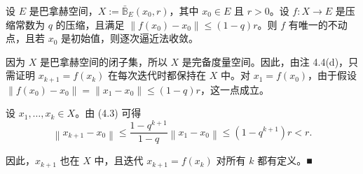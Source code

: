 \begin{proposition}

设 $E$ 是巴拿赫空间，$X := \bar{\mathbb{B}}_E(x_0, r)$，其中 $x_0 \in E$ 且 $r > 0$。设 $f: X \to E$ 是压缩常数为 $q$ 的压缩，且满足 $\|f(x_0) - x_0\| \leq (1 - q)r$。则 $f$ 有唯一的不动点，且若 $x_0$ 是初始值，则逐次逼近法收敛。

\proofhead
因为 $X$ 是巴拿赫空间的闭子集，所以 $X$ 是完备度量空间。因此，由注 4.4(d)，只需证明 $x_{k+1}=f(x_k)$ 在每次迭代时都保持在 $X$ 中。对 $x_1=f(x_0)$，由于假设 $\|f(x_0)-x_0\|=\|x_1-x_0\|\leq(1-q)r$，这一点成立。

设 $ x_1, \ldots, x_k \in X $。由 (4.3) 可得
\[
\left\|x_{k+1}-x_{0}\right\|\leq\frac{1-q^{k+1}}{1-q}\left\|x_{1}-x_{0}\right\|\leq(1-q^{k+1})r<r.
\]

因此，$x_{k+1}$ 也在 $X$ 中，且迭代 $x_{k+1}=f(x_k)$ 对所有 $k$ 都有定义。■

\end{proposition}

